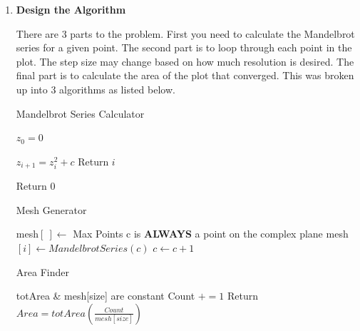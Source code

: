 \documentclass[12pt]{exam}
\begin{document}
\begin{enumerate}
            \item \textbf{Design the Algorithm}
            
            There are 3 parts to the problem. First you need to calculate the Mandelbrot series for a given point. The second part is to loop through each point in the plot. The step size may change based on how much resolution is desired. The final part is to calculate the area of the plot that converged. This was broken up into 3 algorithms as listed below. 

            \begin{algorithm}
                \caption{Mandelbrot Series Calculator}
                
                \begin{algorithmic}
                    
                    \Require $z_0 = 0$

                    \State $z_{i+1} = z^{2}_{i} + c$
                    \State Return $i$
                    \EndIf
                    \EndFor

                        \State Return 0
                    \EndIf
                \end{algorithmic}
            \end{algorithm}
            
            \begin{algorithm}
                \caption{Mesh Generator}
                
                \begin{algorithmic}
                    
                    \Require mesh$[~] \gets$ Max Points 
                    \Ensure c is \textbf{ALWAYS} a point on the complex plane
                     
                         
                            \State mesh$[i] \gets MandelbrotSeries(c)$ 
                            \State $c \gets c+1 $
                        \EndFor
                    \EndFor
                \end{algorithmic}
            \end{algorithm}

            
            \begin{algorithm}
                \caption{Area Finder}
                \begin{algorithmic}
                    \Require totArea \&  mesh[size] are constant 
                            \State Count $\mathrel{+}= 1$
                        \EndIf
                    \EndFor
                    \State Return $Area = totArea\left(\frac{Count}{mesh[size]}\right)$
                \end{algorithmic}
            \end{algorithm}



\end{enumerate}
\end{document}
